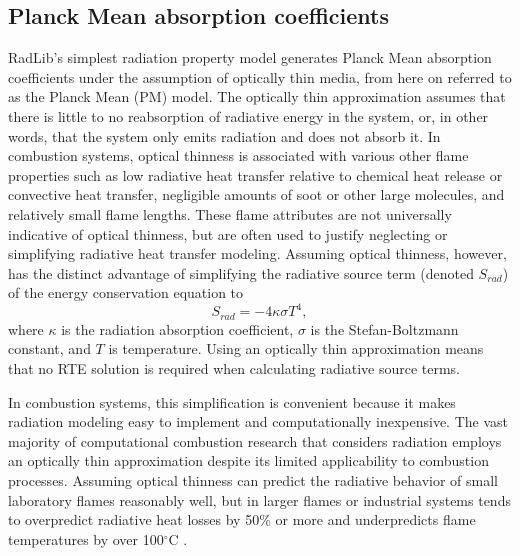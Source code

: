 \documentclass[preprint,12pt]{elsarticle}
\begin{document}

\subsection{Planck Mean absorption coefficients} \label{s:planckmean}

RadLib's simplest radiation property model generates Planck Mean absorption coefficients under the assumption of optically thin media, from here on referred to as the Planck Mean (PM) model.
The optically thin approximation assumes that there is little to no reabsorption of radiative energy in the system, or, in other words, that the system only emits radiation and does not absorb it. In combustion systems, optical thinness is associated with various other flame properties such as low radiative heat transfer relative to chemical heat release or convective heat transfer, negligible amounts of soot or other large molecules, and relatively small flame lengths. These flame attributes are not universally indicative of optical thinness, but are often used to justify neglecting or simplifying radiative heat transfer modeling. Assuming optical thinness, however, has the distinct advantage of simplifying the radiative source term (denoted $S_{rad}$) of the energy conservation equation to 
\begin{equation}
	S_{rad}=-4\kappa \sigma T^4,
\end{equation}
where $\kappa$ is the radiation absorption coefficient, $\sigma$ is the Stefan-Boltzmann constant, and $T$ is temperature. Using an optically thin approximation means that no RTE solution is required when calculating radiative source terms.

In combustion systems, this simplification is convenient because it makes radiation modeling easy to implement and computationally inexpensive. The vast majority of computational combustion research that considers radiation employs an optically thin approximation despite its limited applicability to combustion processes. Assuming optical thinness can predict the radiative behavior of small laboratory flames reasonably well, but in larger flames or industrial systems tends to overpredict radiative heat losses by 50\% or more and underpredicts flame temperatures by over 100$^{\circ}$C \citep{Modest_2016}. 
\end{document}
